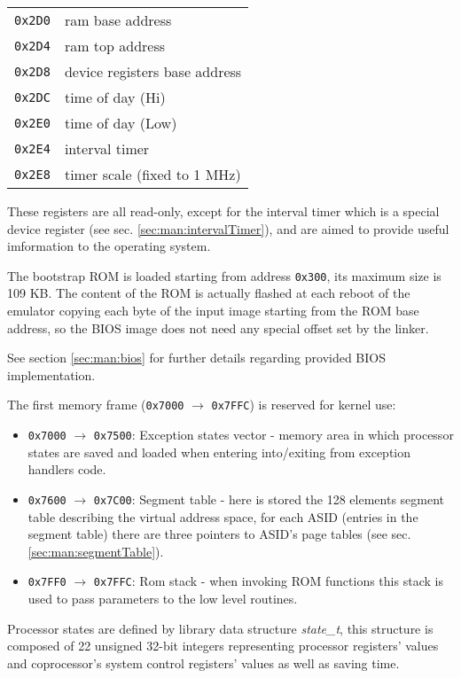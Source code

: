 \begin{tabular}{r|l}
\texttt{0x2D0} & ram base address \\
\texttt{0x2D4} & ram top address \\
\texttt{0x2D8} & device registers base address \\
\texttt{0x2DC} & time of day (Hi) \\
\texttt{0x2E0} & time of day (Low) \\
\texttt{0x2E4} & interval timer \\
\texttt{0x2E8} & timer scale (fixed to 1 MHz) \\
\end{tabular}

These registers are all read-only, except for the interval timer which is a special device register (see sec. \ref{sec:man:intervalTimer}), and are aimed to provide useful imformation to the operating system.

The bootstrap ROM is loaded starting from address \texttt{0x300}, its maximum size is 109 KB.
The content of the ROM is actually flashed at each reboot of the emulator copying each byte of the input image starting from the ROM base address, so the BIOS image does not need any special offset set by the linker.

See section \ref{sec:man:bios} for further details regarding provided BIOS implementation.

\label{sec:man:kernelReservedFrame}
The first memory frame (\texttt{0x7000} $\rightarrow$ \texttt{0x7FFC}) is reserved for kernel use:
\begin{itemize}
\item \texttt{0x7000} $\rightarrow$ \texttt{0x7500}: Exception states vector - memory area in which processor states are saved and loaded when entering into/exiting from exception handlers code.
\item \texttt{0x7600} $\rightarrow$ \texttt{0x7C00}: Segment table - here is stored the 128 elements segment table describing the virtual address space, for each ASID (entries in the segment table) there are three pointers to ASID's page tables (see sec. \ref{sec:man:segmentTable}).
\item \texttt{0x7FF0} $\rightarrow$ \texttt{0x7FFC}: Rom stack - when invoking ROM functions this stack is used to pass parameters to the low level routines.
\end{itemize}

Processor states are defined by library data structure \emph{state\_t}, this structure is composed of 22 unsigned 32-bit integers representing processor registers' values and coprocessor's system control registers' values as well as saving time. 

